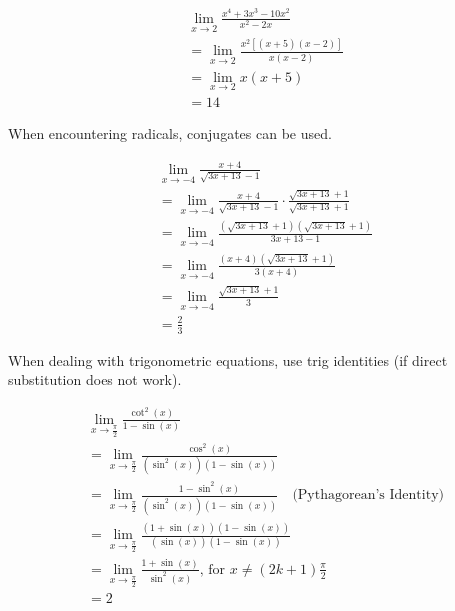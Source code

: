 \documentclass[12pt]{article}
\begin{document}
\begin{align*}
     & \lim_{x \to 2} \frac{x^4 + 3x^3 - 10x^2}{x^2 - 2x}           \\[6pt]
     & = \lim_{x \to 2} \frac{x^2\left[ (x+5)(x-2) \right]}{x(x-2)} \\
     & = \lim_{x \to 2} x(x+5)                                      \\
     & = 14
\end{align*}

\noindent When encountering radicals, conjugates can be used.

\begin{align*}
     & \lim_{x \to -4} \frac{x+4}{\sqrt{3x+13}-1}                                               \\[6pt]
     & = \lim_{x \to -4} \frac{x+4}{\sqrt{3x+13}-1} \cdot \frac{\sqrt{3x+13}+1}{\sqrt{3x+13}+1} \\[6pt]
     & = \lim_{x \to -4} \frac{(\sqrt{3x+13}+1)(\sqrt{3x+13}+1)}{3x+13-1}                       \\[6pt]
     & = \lim_{x \to -4} \frac{(x+4)(\sqrt{3x+13}+1)}{3(x+4)}                                   \\[6pt]
     & = \lim_{x \to -4} \frac{\sqrt{3x+13}+1}{3}                                               \\[6pt]
     & = \frac{2}{3}
\end{align*}

\noindent When dealing with trigonometric equations, use trig identities (if direct substitution does not work).

\begin{align*}
     & \lim_{x \to \frac{\pi}{2}} \frac{\cot^2(x)}{1-\sin(x)}                                                                                \\[6pt]
     & = \lim_{x \to \frac{\pi}{2}} \frac{\cos^2(x)}{\left( \sin^2(x) \right)\left(1-\sin(x)\right)}                                         \\[6pt]
     & = \lim_{x \to \frac{\pi}{2}} \frac{1-\sin^2(x)}{\left( \sin^2(x) \right)\left(1-\sin(x)\right)} \quad \text{(Pythagorean's Identity)} \\[6pt]
     & = \lim_{x \to \frac{\pi}{2}} \frac{\left( 1+\sin(x) \right)\left( 1-\sin(x) \right)}{\left( \sin(x) \right)\left(1-\sin(x)\right)}    \\[6pt]
     & = \lim_{x \to \frac{\pi}{2}} \frac{1+\sin(x)}{\sin^2(x)} \text{, for } x \ne (2k+1)\frac{\pi}{2}                                      \\[6pt]
     & = 2
\end{align*}
\end{document}
